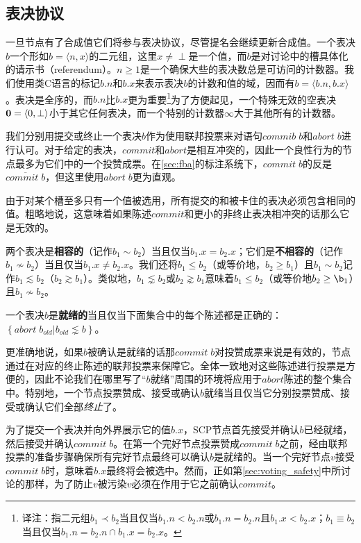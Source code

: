 \subsection{表决协议}
一旦节点有了合成值它们将参与表决协议，尽管提名会继续更新合成值。一个表决$b$一个形如$b=\langle n,x\rangle$的二元组，这里$x\neq \perp$是一个值，而$b$是对讨论中的槽具体化的请示书（referendum）。$n\geq 1$是一个确保大些的表决数总是可访问的计数器。我们使用类C语言的标记$b.n$和$b.x$来表示表决$b$的计数和值的域，因而有$b=\langle b.n, b.x\rangle$。表决是全序的，而$b.n$比$b.x$更为重要{\footnote{译注：指二元组$b_1\prec b_2$当且仅当$b_1.n < b_2.n$或$b_1.n=b_2.n $且$b_1.x < b_2.x$；$b_1\equiv b_2$当且仅当$b_1.n=b_2.n\cap b_1.x=b_2.x$。}}为了方便起见，一个特殊无效的空表决${\bm 0}=\langle 0,\perp\rangle$小于其它任何表决，而一个特别的计数器$\infty$大于其他所有的计数器。

我们分别用提交或终止一个表决$b$作为使用联邦投票来对语句$commib\;b$和$abort\;b$进行认可。对于给定的表决，$commit$和$abort$是相互冲突的，因此一个良性行为的节点最多为它们中的一个投赞成票。在\ref{sec:fba}的标注系统下，$commit\;b$的反是$\overline{commit\;b}$，但这里使用$abort\;b$更为直观。

由于对某个槽至多只有一个值被选用，所有提交的和被卡住的表决必须包含相同的值。粗略地说，这意味着如果陈述$commit$和更小的非终止表决相冲突的话那么它是无效的。

\begin{definition}[相容的]
        两个表决是\textbf{相容的}（记作$b_1 \sim b_2$）当且仅当$b_1.x=b_2.x$；它们是\textbf{不相容的}（记作$b_1\not\sim b_2$）当且仅当$b_1.x\neq b_2.x$。我们还将$b_1\leq b_2$（或等价地，$b_2\geq b_1$）且$b_1\sim b_2$记作$b_1\lesssim b_2$（$b_2\gtrsim b_1$）。类似地，$b_1\lnsim b_2$或$b_2\gnsim b_1$意味着$b_1\leq b_2$（或等价地$b_2\geq \b_1$）且$b_1\not\sim b_2$。
\end{definition}

\begin{definition}[就绪的]
        一个表决$b$是\textbf{就绪的}当且仅当下面集合中的每个陈述都是正确的：$\left\{abort\;b_{old}|b_{old}\lnsim b\right\}$。
\end{definition}

更准确地说，如果$b$被确认是就绪的话那$commit\;b$对投赞成票来说是有效的，节点通过在对应的终止陈述的联邦投票来保障它。全体一致地对这些陈述进行投票是方便的，因此不论我们在哪里写了``$b$就绪''周围的环境将应用于$abort$陈述的整个集合中。特别地，一个节点投票赞成、接受或确认$b$就绪当且仅当它分别投票赞成、接受或确认它们全部\textit{终止}了。

为了提交一个表决并向外界展示它的值$b.x$，SCP节点首先接受并确认$b$已经就绪，然后接受并确认$commit\;b$。在第一个完好节点投票赞成$commit\;b$之前，经由联邦投票的准备步骤确保所有完好节点最终可以确认$b$是就绪的。当一个完好节点$v$接受$commit\;b$时，意味着$b.x$最终将会被选中。然而，正如第\ref{sec:voting_safety}中所讨论的那样，为了防止$v$被污染$v$必须在作用于它之前确认$commit$。


